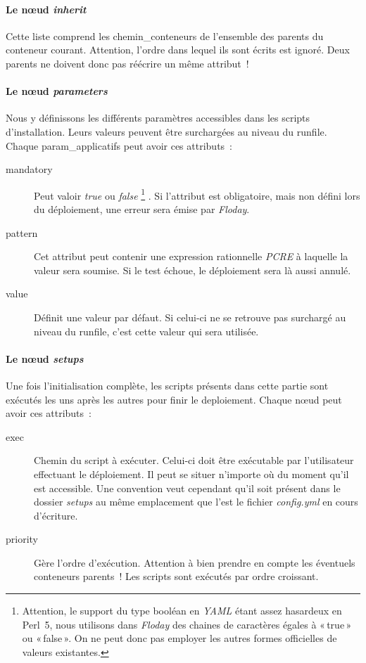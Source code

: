 \paragraph{Le nœud \emph{inherit}}
Cette liste comprend les \glspl{chemin_conteneur} de l'ensemble des parents du conteneur courant.
Attention, l'ordre dans lequel ils sont écrits est ignoré.
Deux parents ne doivent donc pas réécrire un même \gls{attribut} !

\paragraph{Le nœud \emph{parameters}}
Nous y définissons les différents paramètres accessibles dans les scripts d'installation. Leurs valeurs peuvent être surchargées au niveau du \gls{runfile}.
Chaque \gls{param_applicatifs} peut avoir ces attributs~:
\begin{description}
	\item[mandatory] Peut valoir \emph{true} ou \emph{false}%
		\footnote{Attention, le support du type booléan en \emph{YAML} étant assez hasardeux en Perl~5, nous utilisons dans \emph{Floday} des chaines de caractères égales à «\,true\,» ou «\,false\,». On ne peut donc pas employer les autres formes officielles de valeurs existantes.}%
		. Si l'attribut est obligatoire, mais non défini lors du déploiement, une erreur sera émise par \emph{Floday}.
	\item[pattern] Cet attribut peut contenir une expression rationnelle \emph{PCRE} à laquelle la valeur sera soumise. Si le test échoue, le déploiement sera là aussi annulé.
	\item[value] Définit une valeur par défaut. Si celui-ci ne se retrouve pas surchargé au niveau du \gls{runfile}, c'est cette valeur qui sera utilisée.
\end{description}

\paragraph{Le nœud \emph{setups}}
Une fois l'\gls{initialisation} complète, les scripts présents dans cette partie sont exécutés les uns après les autres pour finir le \gls{deploiement}.
Chaque nœud peut avoir ces attributs~:
\begin{description}
	\item[exec] Chemin du script à exécuter. Celui-ci doit être exécutable par l'utilisateur effectuant le déploiement. Il peut se situer n'importe où du moment qu'il est accessible. Une convention veut cependant qu'il soit présent dans le dossier \emph{setups} au même emplacement que l'est le fichier \emph{config.yml} en cours d'écriture.
	\item[priority] Gère l'ordre d'exécution. Attention à bien prendre en compte les éventuels conteneurs parents~! Les scripts sont exécutés par ordre croissant.
\end{description}

